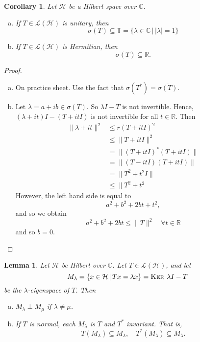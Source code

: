 \documentclass[10pt, oneside, reqno]{amsart}
\theoremstyle{plain}%
\newtheorem{lem}[thm]{Lemma}
\newtheorem*{cor}{Corollary}
\theoremstyle{definition}
\theoremstyle{remark}
\newcommand{\given}{ \, | \,}
\newcommand{\R}{\mathbb{R}}
\newcommand{\Com}{\mathbb{C}}
\renewcommand{\ker}{\textsc{Ker\ }}
\begin{document}
\begin{cor}
    Let $\mathcal H$ be a Hilbert space over $\Com$.  \begin{enumerate}[(a)]
        \item If $T \in \mathcal L(\mathcal H)$ is unitary, then \[
            \sigma(T) \subseteq \mathbb{T} = \{ \lambda \in \Com \given | \lambda | = 1 \}\]
        \item If $T \in \mathcal L(\mathcal H)$ is Hermitian, then \[
            \sigma(T) \subseteq \R.
        \]
    \end{enumerate}
\end{cor}
\begin{proof}{\ }\begin{enumerate}[(a)]
    \item On practice sheet.  Use the fact that $\sigma(T^*) = \overline{\sigma(T)}$.
    \item Let $\lambda = a + ib \in \sigma(T)$.  So $\lambda I - T$ is not invertible.  Hence, $(\lambda + it)I - (T + it I)$ is not invertible for all $t \in \R$. 
  Then \begin{align*}
        \| \lambda + it \|^2    &\leq r(T + itI)^2 \\
                                &\leq \| T + itI \|^2 \\
                                &= \| (T + itI)^* ( T + itI) \| \\
                                &= \| (T - itI)(T + itI) \| \\
                                &= \| T^2 + t^2 I \| \\
                                &\leq \| T^2 + t^2
    \end{align*}  However, the left hand side is equal to \[
        a^2 + b^2 + 2bt + t^2,
    \] and so we obtain \[
        a^2 + b^2 + 2bt \leq \| T \|^2 \quad \forall t \in \R
    \] and so $b = 0$.  
\end{enumerate}
\end{proof}

\begin{lem}
    Let $\mathcal H$ be Hilbert over $\Com$.  Let $T \in \mathcal L(\mathcal H)$, and let \[
        M_\lambda = \{ x \in \mathcal H \given Tx = \lambda x \} = \ker \lambda I - T
    \]  be the $\lambda$-eigenspace of $T$.  Then \begin{enumerate}[(a)]
        \item $M_\lambda \perp M_\mu$ if $\lambda \neq \mu$.  
        \item If $T$ is normal, each $M_\lambda$ is $T$ and $T^*$ invariant.  That is, \[
            T(M_\lambda) \subseteq M_\lambda, \quad T^*(M_\lambda) \subseteq M_\lambda.
        \]
    \end{enumerate}
\end{lem}
\end{document}
